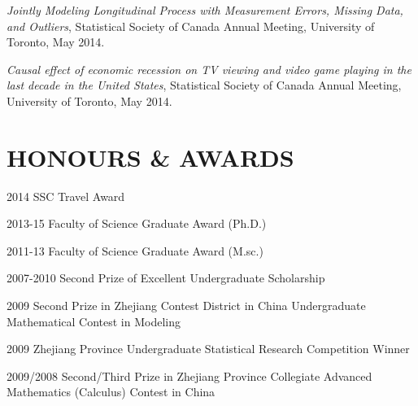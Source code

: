 \documentclass[margin]{res}
\begin{document}
\begin{resume}
{\it Jointly Modeling Longitudinal Process with Measurement Errors, Missing Data, and Outliers},
Statistical Society of Canada Annual Meeting, University of Toronto, May 2014.

{\it Causal effect of economic recession on TV viewing and video game playing in the last decade in the United States}, Statistical Society of Canada Annual Meeting, University of Toronto, May 2014.



\section{HONOURS \&  AWARDS}
 2014 SSC Travel Award

 2013-15 Faculty of Science Graduate Award (Ph.D.)

 2011-13 Faculty of Science Graduate Award (M.sc.)

 2007-2010 Second Prize of Excellent Undergraduate Scholarship 

 2009 Second Prize in Zhejiang Contest District in China Undergraduate Mathematical Contest in Modeling

 2009 Zhejiang Province Undergraduate Statistical Research Competition Winner

  2009/2008 Second/Third Prize in Zhejiang Province Collegiate Advanced Mathematics (Calculus)
Contest in China


\end{resume}
\end{document}
